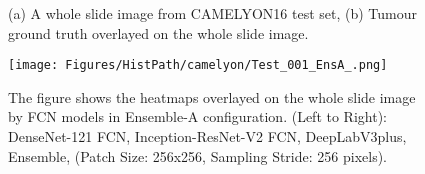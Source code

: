 \documentclass[times,twocolumn,final,authoryear]{tmp}
\begin{document}
\begin{figure}
    \caption{(a) A whole slide image from CAMELYON16 test set, (b)  Tumour ground truth overlayed on the whole slide image.}
    \label{path_fig:Test_001_GT}
\end{figure} 

\begin{figure}
\texttt{[image: Figures/HistPath/camelyon/Test\_001\_EnsA\_.png]}
    \caption{The figure shows the heatmaps overlayed on the whole slide image by FCN models in Ensemble-A configuration. (Left to Right): DenseNet-121 FCN, Inception-ResNet-V2 FCN, DeepLabV3plus, Ensemble, (Patch Size: 256x256, Sampling Stride: 256 pixels).}
    \label{path_fig:EnsA}
\end{figure} 
\end{document}
